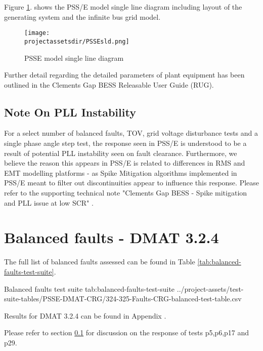 \documentclass{../grid-link-report}
\newcommand{\projectassetsdir}{../project-assets}
\begin{document}
	Figure \ref{fig:PSSEmodelSLD}. shows the PSS/E model single line diagram including layout of the generating system and the infinite bus grid model.
	
	\begin{figure}[H]
		\centering
		\texttt{[image: \\projectassetsdir/PSSEsld.png]}
		\caption{PSSE model single line diagram}
		\label{fig:PSSEmodelSLD}
	\end{figure}
	
	Further detail regarding the detailed parameters of plant equipment has been outlined in the Clements Gap BESS Releasable User Guide (RUG).

	\subsection{Note On PLL Instability}
	\label{foreword on instability}
	
	For a select number of balanced faults, TOV, grid voltage disturbance tests and a single phase angle step test, the response seen in PSS/E is understood to be a result of potential PLL instability seen on fault clearance. Furthermore, we believe the reason this appears in PSS/E is related to differences in RMS and EMT modelling platforms - as Spike Mitigation algorithms implemented in PSS/E meant to filter out discontinuities appear to influence this response. Please refer to the supporting technical note "Clements Gap BESS - Spike mitigation and PLL issue at low SCR" \cite{tech-note}.
	
	
	\section{Balanced faults - DMAT 3.2.4}
	\label{sec:balanced-faults}
	
	
	The full list of balanced faults assessed can be found in Table \ref{tab:balanced-faults-test-suite}.
	
	{
		\fontsize{5}{7}\selectfont
		\autoscaledlongtable
		{Balanced faults test suite}
		{tab:balanced-faults-test-suite}
		{\projectassetsdir/test-suite-tables/PSSE-DMAT-CRG/324-325-Faults-CRG-balanced-test-table.csv}
	}
	
	Results for DMAT 3.2.4 can be found in Appendix .
	
	Please refer to section \ref{foreword on instability} for discussion on the response of tests p5,p6,p17 and p29.
	
\end{document}

